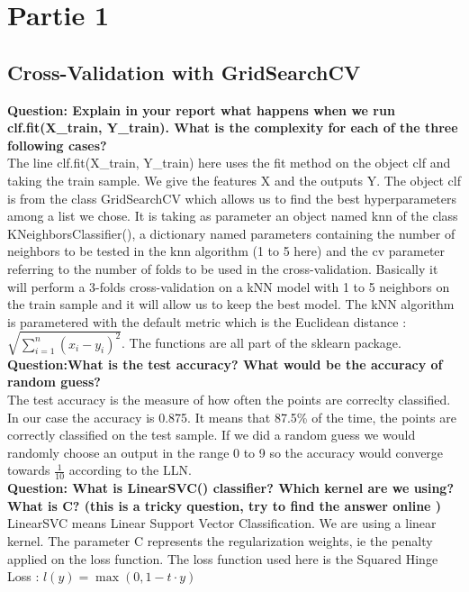 \section{Partie 1}

\subsection{Cross-Validation with GridSearchCV}
\textbf{{Question}: Explain in your report what happens when we run clf.fit(X\_train, Y\_train). What is the complexity for each of the three following cases?} \\
The line clf.fit(X\_train, Y\_train) here uses the fit method on the object  clf and taking the train sample. We give the features X and the outputs Y. The object clf is from the class GridSearchCV which allows us to find the best hyperparameters among a list we chose. It is taking as parameter an object named knn of the class KNeighborsClassifier(), a dictionary named parameters containing the number of neighbors to be tested in the knn algorithm (1 to 5 here) and the cv parameter referring to the number of folds to be used in the cross-validation. Basically it will perform a 3-folds cross-validation on a kNN model with 1 to 5 neighbors on the train sample and it will allow us to keep the best model. The kNN algorithm is parametered with the default metric which is the Euclidean distance : $\sqrt{\sum^n_{i=1}(x_i - y_i)^2}$. The functions are all part of the sklearn package. \\

\textbf{{Question}:What is the test accuracy? What would be the accuracy of random guess?} \\
The test accuracy is the measure of how often the points are correclty classified. In our case the accuracy is 0.875.  It means that 87.5\% of the time, the points are correctly classified on the test sample. If we did a random guess we would randomly choose an output in the range 0 to 9 so the accuracy would converge towards $\frac{1}{10}$ according to the LLN.  \\


\textbf{{Question}:  What is LinearSVC() classifier? Which kernel are we using? What is C? (this is a tricky question, try to find the answer online )}\\
LinearSVC means Linear Support Vector Classification. We are using a linear kernel. The parameter C represents the regularization weights, ie the penalty applied on the loss function. The loss function used here is the Squared Hinge Loss : $l(y)=\max(0,1-t\cdot y)$ \\


